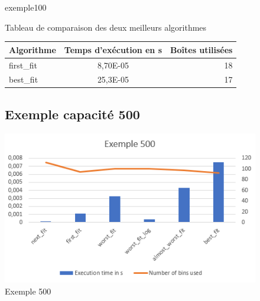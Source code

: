 \documentclass{article}
\begin{document}
\begin{figure}
\begin{center}

exemple100

Tableau de comparaison des deux meilleurs algorithmes

\begin{tabular}{|l|c|r|}
  \hline
  Algorithme & Temps d'exécution en s & Boîtes utilisées \\
  \hline
  first\_fit & 8,70E-05 & 18 \\
  best\_fit & 25,3E-05  & 17 \\
  \hline
\end{tabular}




\subsection{Exemple capacité 500}
\includegraphics{exemple500.png}
\end{center}
\caption{Exemple 500}
\end{figure}
\end{document}
